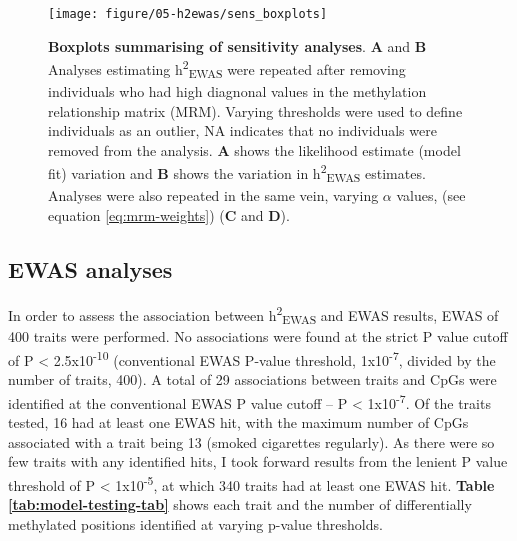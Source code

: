 \documentclass[11pt,oneside]{bristolthesis}
\begin{document}
\begin{figure}

{\centering \texttt{[image: figure/05-h2ewas/sens\_boxplots]} 

}

\caption[Boxplots summarising of sensitivity analyses]{\textbf{Boxplots summarising of sensitivity analyses}. \textbf{A} and \textbf{B} Analyses estimating h\textsuperscript{2}\textsubscript{EWAS} were repeated after removing individuals who had high diagnonal values in the methylation relationship matrix (MRM). Varying thresholds were used to define individuals as an outlier, NA indicates that no individuals were removed from the analysis. \textbf{A} shows the likelihood estimate (model fit) variation and \textbf{B} shows the variation in h\textsuperscript{2}\textsubscript{EWAS} estimates. Analyses were also repeated in the same vein, varying \(\alpha\) values, (see equation \eqref{eq:mrm-weights}) (\textbf{C} and \textbf{D}).}\label{fig:h2ewas-sens}
\end{figure}
\hypertarget{results-ewas-analyses-05}{%
\subsection{EWAS analyses}\label{results-ewas-analyses-05}}

In order to assess the association between h\textsuperscript{2}\textsubscript{EWAS} and EWAS results, EWAS of 400 traits were performed. No associations were found at the strict P value cutoff of P \textless{} 2.5x10\textsuperscript{-10} (conventional EWAS P-value threshold, 1x10\textsuperscript{-7}, divided by the number of traits, 400). A total of 29 associations between traits and CpGs were identified at the conventional EWAS P value cutoff -- P \textless{} 1x10\textsuperscript{-7}. Of the traits tested, 16 had at least one EWAS hit, with the maximum number of CpGs associated with a trait being 13 (smoked cigarettes regularly). As there were so few traits with any identified hits, I took forward results from the lenient P value threshold of P \textless{} 1x10\textsuperscript{-5}, at which 340 traits had at least one EWAS hit. \textbf{Table \ref{tab:model-testing-tab}} shows each trait and the number of differentially methylated positions identified at varying p-value thresholds.
\end{document}
